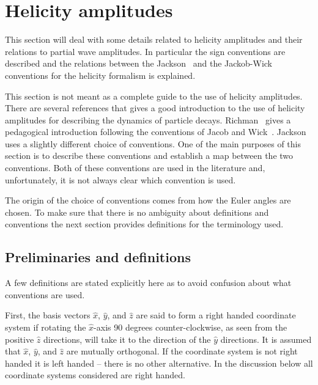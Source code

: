 \section{Helicity amplitudes}
\label{sect:helampconventions}

This section will deal with some details related to helicity amplitudes
and their relations to partial wave amplitudes. In particular 
the sign conventions are described and
the relations between the Jackson~\cite{Jack64} and the 
Jackob-Wick~\cite{Jaco59} conventions
for the helicity formalism is explained.

This section is not meant as a complete guide to the use of
helicity amplitudes. There are several references that gives a 
good introduction to the use of helicity amplitudes for describing
the dynamics of particle decays. Richman~\cite{Rich84} gives
a pedagogical introduction following the conventions of
Jacob and Wick~\cite{Jaco59}. Jackson~\cite{Jack64} uses a slightly
different choice of conventions. One of the main purposes of this section is
to describe these conventions and establish a map between the two
conventions. Both of these conventions are used in the literature
and, unfortunately, it is not always clear which convention is used. 

The origin of the choice of conventions comes from how the 
Euler angles are chosen. To make sure that there is no ambiguity
about definitions and conventions the next section provides definitions
for the terminology used. 

\subsection{Preliminaries and definitions}

A few definitions are stated explicitly here as to avoid
confusion about what conventions are used.

First, the basis vectors $\hat x$, $\hat y$, and $\hat z$ are
said to form a right handed coordinate system if rotating the
$\hat x$-axis 90 degrees counter-clockwise, as seen from the positive
$\hat z$ directions, will take it to the direction of the $\hat y$
directions. It is assumed that $\hat x$, $\hat y$, and $\hat z$ are
mutually orthogonal. If the coordinate system is not right handed it is 
left handed -- there is no other alternative. In the discussion
below all coordinate systems considered are right handed.

